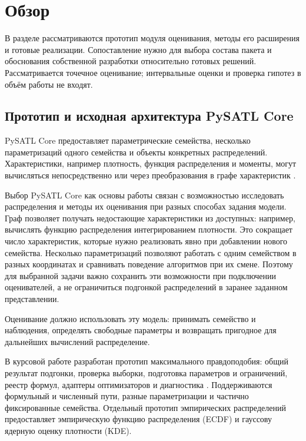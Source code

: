 \section{Обзор}
\label{sec:relatedworks}

В разделе рассматриваются прототип модуля оценивания, методы его расширения
и готовые реализации. Сопоставление нужно для выбора состава пакета и
обоснования собственной разработки относительно готовых решений. Рассматривается точечное оценивание;
интервальные оценки и проверка гипотез в объём работы не входят.

\subsection{Прототип и исходная архитектура PySATL Core}
PySATL Core предоставляет параметрические семейства, несколько параметризаций
одного семейства и объекты конкретных распределений. Характеристики, например
плотность, функция распределения и моменты, могут вычисляться непосредственно
или через преобразования в графе характеристик \cite{reviewCore}.

Выбор PySATL Core как основы работы связан с возможностью исследовать
распределения и методы их оценивания при разных способах задания модели.
Граф позволяет получать недостающие характеристики из доступных:
например, вычислять функцию распределения интегрированием плотности.
Это сокращает число характеристик, которые нужно реализовать явно
при добавлении нового семейства. Несколько параметризаций позволяют
работать с одним семейством в разных координатах и сравнивать поведение
алгоритмов при их смене. Поэтому для выбранной задачи важно сохранить
эти возможности при подключении оценивателей, а не ограничиться
подгонкой распределений в заранее заданном представлении.

Оценивание должно использовать эту модель: принимать семейство и наблюдения,
определять свободные параметры и возвращать пригодное для дальнейших
вычислений распределение.

В курсовой работе разработан прототип максимального правдоподобия:
общий результат подгонки, проверка выборки, подготовка параметров и ограничений,
реестр формул, адаптеры оптимизаторов и диагностика
\cite{reviewPrototype}. Поддерживаются формульный и численный пути,
разные параметризации и частично фиксированные семейства. Отдельный прототип
эмпирических распределений предоставляет эмпирическую функцию распределения
(ECDF) и гауссову ядерную оценку плотности (KDE).

